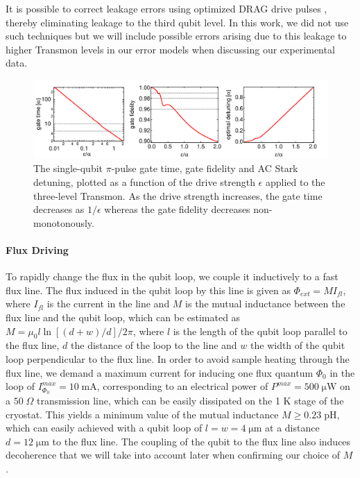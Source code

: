 \smallskip

It is possible to correct leakage errors using optimized DRAG drive pulses \cite{lucero_reduced_2010,chow_optimized_2010}, thereby eliminating leakage to the third qubit level. In this work, we did not use such techniques but we will  include possible errors arising due to this leakage to higher Transmon levels in our error models when discussing our experimental data.

\begin{figure}[htp!]
	\centering
	\includegraphics[width=\textwidth]{"./material/mathematica/three_level_driving_errors"}
	\caption[Single-qubit $\pi$-pulse gate time, gate fidelity and AC stark detuning as a function of drive strength]{The single-qubit $\pi$-pulse gate time, gate fidelity and AC Stark detuning, plotted as a function of the drive strength $\epsilon$ applied to the three-level Transmon. As the drive strength increases, the gate time decreases as $1/\epsilon$ whereas the gate fidelity decreases non-monotonously.}
	\label{fig:three_level_driving_errors}
\end{figure}

\paragraph{Flux Driving}

To rapidly change the flux in the qubit loop, we couple it inductively to a fast flux line. The flux induced in the qubit loop by this line is given as $\Phi_{ext}=M I_{fl}$, where $I_{fl}$ is the current in the line and $M$ is the mutual inductance between the flux line and the qubit loop, which can be estimated as $M=\mu_0 l \ln{\left[(d+w)/d\right]}/2\pi$, where $l$ is the length of the qubit loop parallel to the flux line, $d$ the distance of the loop to the line and $w$ the width of the qubit loop perpendicular to the flux line. In order to avoid sample heating through the flux line, we demand a maximum current for inducing one flux quantum $\Phi_0$ in the loop of $I_{\Phi_0}^{max}=10\;\mathrm{mA}$, corresponding to an electrical power of $P^{max}=500\;\mathrm{\mu W}$ on a $50 \; \Omega$ transmission line, which can be easily dissipated on the 1 K stage of the cryostat. This yields a minimum value of the mutual inductance $M\ge 0.23\;\mathrm{pH}$, which can easily achieved with a qubit loop of $l=w=4\;\mathrm{\mu m}$ at a distance $d=12\;\mathrm{\mu m}$ to the flux line. The coupling of the qubit to the flux line also induces decoherence that we will take into account later when confirming our choice of $M$.

